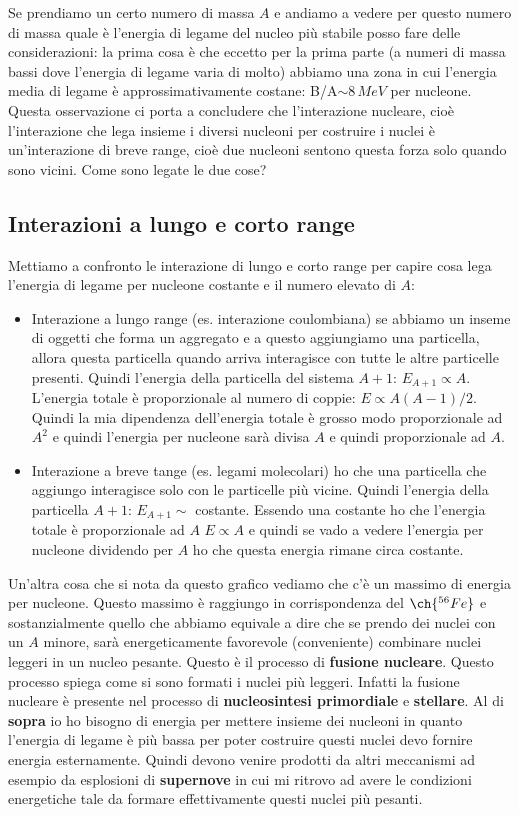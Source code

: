 Se prendiamo un certo numero di massa $A$ e andiamo a vedere per questo numero di massa quale è l'energia di legame del nucleo più stabile posso fare delle considerazioni: la prima cosa è che eccetto per la prima parte (a numeri di massa bassi dove l'energia di legame varia di molto) abbiamo una zona in cui l'energia media di legame è approssimativamente costane: B/A$\sim8\,MeV$ per nucleone. Questa osservazione ci porta a concludere che l'interazione nucleare, cioè l'interazione che lega insieme i diversi nucleoni per costruire i nuclei è un'interazione di breve range, cioè due nucleoni sentono questa forza solo quando sono vicini. Come sono legate le due cose?
\subsection{Interazioni a lungo e corto range}
Mettiamo a confronto le interazione di lungo e corto range per capire cosa lega l'energia di legame per nucleone costante e il numero elevato di $A$:
\begin{itemize}
    \item Interazione a lungo range (es. interazione coulombiana) se abbiamo un inseme di oggetti che forma un aggregato e a questo aggiungiamo una particella, allora questa particella quando arriva interagisce con tutte le altre particelle presenti. Quindi l'energia della particella del sistema $A+1$: $E_{A+1} \propto A$. L'energia totale è proporzionale al numero di coppie: $E\propto A(A-1)/2$. Quindi la mia dipendenza dell'energia totale è grosso modo proporzionale ad $A^2$ e quindi l'energia per nucleone sarà divisa $A$ e quindi proporzionale ad $A$.
    \item Interazione a breve tange (es. legami molecolari) ho che una particella che aggiungo interagisce solo con le particelle più vicine. Quindi l'energia della particella $A+1$: $E_{A+1} \sim $ costante. Essendo una costante ho che l'energia totale è proporzionale ad $A$ $E\propto A$ e quindi se vado a vedere l'energia per nucleone dividendo per $A$ ho che questa energia rimane circa costante.
\end{itemize}
Un'altra cosa che si nota da questo grafico vediamo che c'è un massimo di energia per nucleone. Questo massimo è raggiungo in corrispondenza del $\ch{^{56}Fe}$ e sostanzialmente quello che abbiamo equivale a dire che se prendo dei nuclei con un $A$ minore, sarà energeticamente favorevole (conveniente) combinare nuclei leggeri in un nucleo pesante. Questo è il processo di \textbf{fusione nucleare}. Questo processo spiega come si sono formati i nuclei più leggeri. Infatti la fusione nucleare è presente nel processo di \textbf{nucleosintesi primordiale} e \textbf{stellare}. Al di \textbf{sopra} io ho bisogno di energia per mettere insieme dei nucleoni in quanto l'energia di legame è più bassa per poter costruire questi nuclei devo fornire energia esternamente. Quindi devono venire prodotti da altri meccanismi ad esempio da esplosioni di \textbf{supernove} in cui mi ritrovo ad avere le condizioni energetiche tale da formare effettivamente questi nuclei più pesanti.

